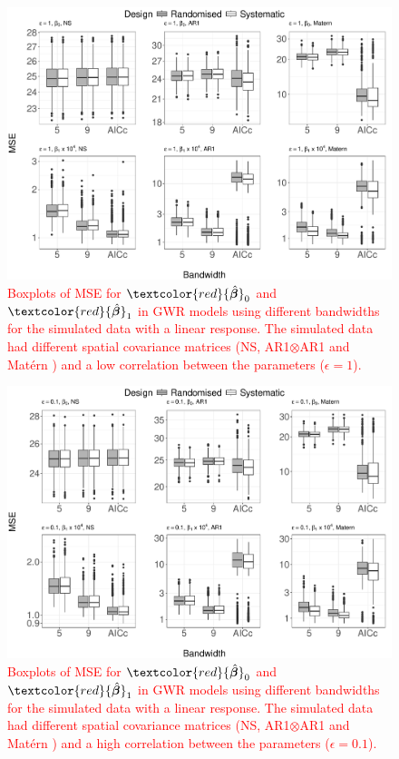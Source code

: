 \documentclass[a4paper]{article} 	%
\newcommand{\Matern}{Mat\'ern }
\newcommand{\zc}[1]{\textcolor{red}{#1}}
\begin{document}
\begin{figure}[!htp]
	\centering
	\includegraphics[width=\linewidth]{Col_LinCombMSE_newpar_1K_V4.pdf}
	\caption{\zc{Boxplots of MSE for $\zc{\hat{\bm{\beta}}}_0$ and $\zc{\hat{\bm{\beta}}}_1$ in GWR models using different bandwidths for the simulated data with a linear response. The simulated data had different spatial covariance matrices (NS, AR1$\otimes$AR1 and \Matern) and a low correlation between the parameters ($\epsilon=1$).}}\label{fig:LinBetaMSE}
\end{figure}


\begin{figure}[!thp]
	\centering
	\includegraphics[width=\linewidth]{Col_LinCombMSE_newpar_1K_eta01_V4.pdf}
	\caption{\zc{Boxplots of MSE for $\zc{\hat{\bm{\beta}}}_0$ and $\zc{\hat{\bm{\beta}}}_1$ in GWR models using different bandwidths for the simulated data with a linear response. The simulated data had different spatial covariance matrices (NS, AR1$\otimes$AR1 and \Matern) and a high correlation between the parameters ($\epsilon=0.1$).}}\label{fig:LinBetaMSEeta01}
\end{figure}
\end{document}
